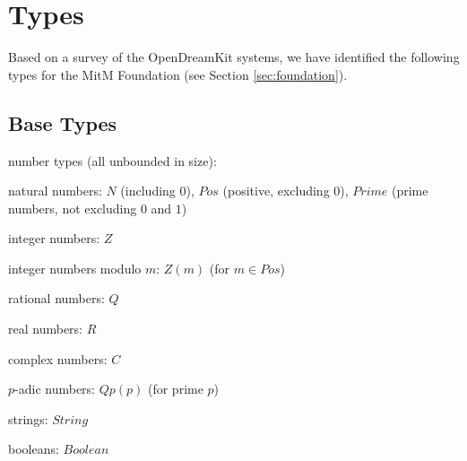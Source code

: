 \section{Types}\label{app:types}

Based on a survey of the OpenDreamKit systems, we have identified the following types for the MitM Foundation (see Section \ref{sec:foundation}).
\subsection{Base Types}
\begin{compactitem}
 \item number types (all unbounded in size):
  \begin{compactitem}
   \item natural numbers: $N$ (including $0$), $Pos$ (positive, excluding $0$), $Prime$ (prime numbers, not excluding $0$ and $1$)
   \item integer numbers: $Z$
   \item integer numbers modulo $m$: $Z(m)$ (for $m\in Pos$)
   \item rational numbers: $Q$
   \item real numbers: $R$ 
   \item complex numbers: $C$
   \item $p$-adic numbers: $Qp(p)$ (for prime $p$)
  \end{compactitem}
 \item strings: $String$
 \item booleans: $Boolean$
 \end{compactitem}

